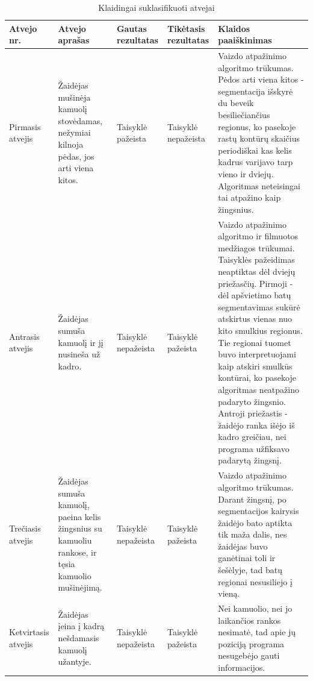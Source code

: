 \documentclass{VUMIFPSkursinis}
\begin{document}
\begin{table}[H]\footnotesize
	\centering
	\caption{Klaidingai suklasifikuoti atvejai}
	\begin{tabular}{|p{2cm}|p{3cm}|p{2cm}|p{2cm}|p{6cm}|}  \hline
		\textbf{Atvejo nr.} & \textbf{Atvejo aprašas} & \textbf{Gautas rezultatas} &     \textbf{Tikėtasis rezultatas} & \textbf{Klaidos paaiškinimas} \\
		
		\hline
		Pirmasis atvejis    & Žaidėjas mušinėja kamuolį stovėdamas, nežymiai kilnoja pėdas, jos arti viena kitos.                & Taisyklė pažeista   & Taisyklė nepažeista & Vaizdo atpažinimo algoritmo trūkumas. Pėdos arti viena kitos - segmentacija išskyrė du beveik besiliečiančius regionus, ko pasekoje rastų kontūrų skaičius periodiškai kas kelis kadrus varijavo tarp vieno ir dviejų. Algoritmas neteisingai tai atpažino kaip žingsnius.                                                                                                                                                                                                                      \\ \hline
		Antrasis atvejis    & Žaidėjas sumuša kamuolį ir jį nusineša už kadro.                                                   & Taisyklė nepažeista & Taisyklė pažeista   & Vaizdo atpažinimo algoritmo ir filmuotos medžiagos trūkumai. Taisyklės pažeidimas neaptiktas dėl dviejų priežasčių. Pirmoji - dėl apšvietimo batų segmentavimas sukūrė atskirtus vienas nuo kito smulkius regionus. Tie regionai tuomet buvo interpretuojami kaip atskiri smulkūs kontūrai, ko pasekoje algoritmas neatpažino padaryto žingsnio. Antroji priežastis - žaidėjo ranka išėjo iš kadro greičiau, nei programa užfiksavo padarytą žingsnį. \\ \hline
		Trečiasis atvejis   & Žaidėjas sumuša kamuolį, paeina kelis žingsnius su kamuoliu rankose, ir tęsia kamuolio mušinėjimą. & Taisyklė nepažeista & Taisyklė pažeista   & Vaizdo atpažinimo algoritmo trūkumas. Darant žingsnį, po segmentacijos kairysis žaidėjo bato aptikta tik maža dalis, nes žaidėjas buvo ganėtinai toli ir šešėlyje, tad batų regionai nesusiliejo į vieną.                                                                                                                                                                                                                                                                                     \\ \hline
		Ketvirtasis atvejis & Žaidėjas įeina į kadrą nešdamasis kamuolį užantyje.                                                & Taisyklė nepažeista & Taisyklė pažeista   & Nei kamuolio, nei jo laikančios rankos nesimatė, tad apie jų poziciją programa nesugebėjo gauti informacijos.                                                                                                                                                                                                                                                                                                                                                                                   \\ \hline
	\end{tabular}
	\label{tab:table example}
\end{table}
\end{document}
